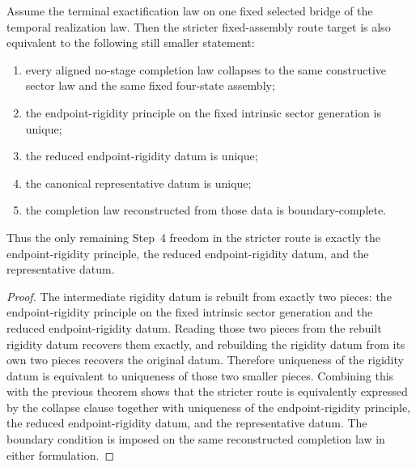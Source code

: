 \begin{theorem}
\label{thm:canonical-law-native-rigidity-boundary-route-target}
Assume the terminal exactification law on one fixed selected bridge of the
temporal realization law. Then the stricter fixed-assembly route target is also
equivalent to the following still smaller statement:
\begin{enumerate}
\item every aligned no-stage completion law collapses to the same constructive
sector law and the same fixed four-state assembly;
\item the endpoint-rigidity principle on the fixed intrinsic sector generation
is unique;
\item the reduced endpoint-rigidity datum is unique;
\item the canonical representative datum is unique;
\item the completion law reconstructed from those data is boundary-complete.
\end{enumerate}
Thus the only remaining Step~4 freedom in the stricter route is exactly the
endpoint-rigidity principle, the reduced endpoint-rigidity datum, and the
representative datum.
\end{theorem}

\begin{proof}
The intermediate rigidity datum is rebuilt from exactly two pieces: the
endpoint-rigidity principle on the fixed intrinsic sector generation and the
reduced endpoint-rigidity datum. Reading those two pieces from the rebuilt
rigidity datum recovers them exactly, and rebuilding the rigidity datum from
its own two pieces recovers the original datum. Therefore uniqueness of the
rigidity datum is equivalent to uniqueness of those two smaller pieces.
Combining this with the previous theorem shows that the stricter route is
equivalently expressed by the collapse clause together with uniqueness of the
endpoint-rigidity principle, the reduced endpoint-rigidity datum, and the
representative datum. The boundary condition is imposed on the same
reconstructed completion law in either formulation.
\end{proof}

